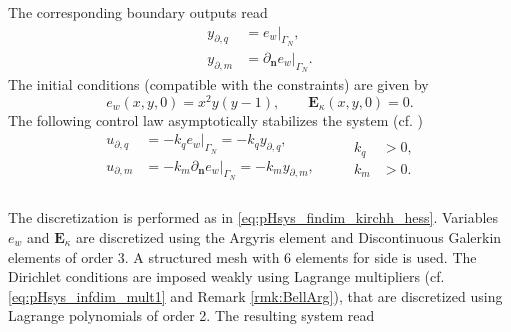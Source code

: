 The corresponding boundary outputs read
\begin{equation*}
\begin{aligned}
y_{\partial, q} &= e_w|_{\Gamma_N}, \\
y_{\partial, m} &=\partial_{\bm{n}} e_w|_{\Gamma_N}.
\end{aligned}
\end{equation*}
The initial conditions (compatible with the constraints) are given by
\[
e_w(x,y,0) = x^2 y (y-1), \qquad \bm{E}_\kappa(x,y,0) ={0}.
\]
The following control law asymptotically stabilizes the system (cf. \cite{lagnese1989})
\begin{equation}\label{eq:ctrllaw_Kir}
\begin{aligned}
u_{\partial, q} &= - k_q e_w|_{\Gamma_N} = - k_q y_{\partial, q}, \\
u_{\partial, m} &= - k_m \partial_{\bm{n}} e_w|_{\Gamma_N}  = - k_m y_{\partial, m}, \\
\end{aligned} \qquad
\begin{aligned}
 k_q&>0, \\
 k_m&>0.
\end{aligned}
\end{equation}
\\

The discretization is performed as in \eqref{eq:pHsys_findim_kirchh_hess}. Variables $e_w$ and $\bm{E}_\kappa$ are discretized using the Argyris element and Discontinuous Galerkin elements of order 3. A structured mesh with 6 elements for side is used. The Dirichlet conditions are imposed weakly using Lagrange multipliers (cf. \eqref{eq:pHsys_infdim_mult1} and Remark \ref{rmk:BellArg}), that are discretized using Lagrange polynomials of order 2. The resulting system read

